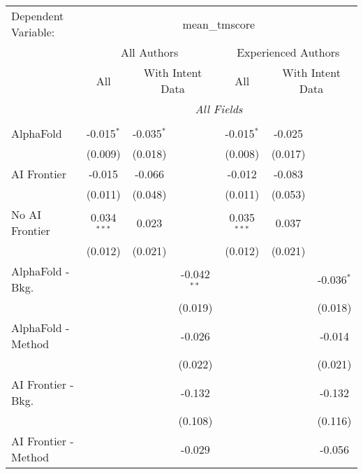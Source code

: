\begingroup
\centering
\begin{tabular}{lcccccc}
   \tabularnewline \midrule \midrule
   Dependent Variable: & \multicolumn{6}{c}{mean\_tmscore}\\
 & \multicolumn{3}{c}{All Authors} & \multicolumn{3}{c}{Experienced Authors} \\
\cmidrule(lr){2-4} \cmidrule(lr){5-7}
 & \multicolumn{1}{c}{All} & \multicolumn{2}{c}{With Intent Data} & \multicolumn{1}{c}{All} & \multicolumn{2}{c}{With Intent Data} \\
\cmidrule(lr){2-2} \cmidrule(lr){3-4} \cmidrule(lr){5-5} \cmidrule(lr){6-7}
 & \multicolumn{6}{c}{\textit{All Fields}} \\ \\
   AlphaFold               & -0.015$^{*}$  & -0.035$^{*}$ &               & -0.015$^{*}$  & -0.025  &   \\   
                           & (0.009)       & (0.018)      &               & (0.008)       & (0.017) &   \\   
   AI Frontier             & -0.015        & -0.066       &               & -0.012        & -0.083  &   \\   
                           & (0.011)       & (0.048)      &               & (0.011)       & (0.053) &   \\   
   No AI Frontier          & 0.034$^{***}$ & 0.023        &               & 0.035$^{***}$ & 0.037   &   \\   
                           & (0.012)       & (0.021)      &               & (0.012)       & (0.021) &   \\   
   AlphaFold - Bkg.        &               &              & -0.042$^{**}$ &               &         & -0.036$^{*}$\\   
                           &               &              & (0.019)       &               &         & (0.018)\\   
   AlphaFold - Method      &               &              & -0.026        &               &         & -0.014\\   
                           &               &              & (0.022)       &               &         & (0.021)\\   
   AI Frontier - Bkg.      &               &              & -0.132        &               &         & -0.132\\   
                           &               &              & (0.108)       &               &         & (0.116)\\   
   AI Frontier - Method    &               &              & -0.029        &               &         & -0.056\\   

\end{tabular}
